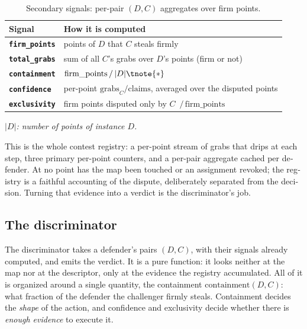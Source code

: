 \begin{otherlanguage}{english}
\begin{table}[ht]
  \centering
  \small
  \begin{threeparttable}
  \renewcommand{\arraystretch}{1.5}
  \begin{tabular}{@{}l p{11.6cm}@{}}
    \toprule
    \textbf{Signal} & \textbf{How it is computed} \\
    \midrule
    \textbf{\texttt{firm\_points}} & points of $D$ that $C$ steals firmly \\
    \textbf{\texttt{total\_grabs}} & sum of all $C$'s grabs over $D$'s points (firm or not) \\
    \textbf{\texttt{containment}}  & $\mathrm{firm\_points}\,/\,|D|\tnote{*}$ \\
    \textbf{\texttt{confidence}}   & per-point $\mathrm{grabs}_C/\mathrm{claims}$, averaged over the disputed points \\
    \textbf{\texttt{exclusivity}}  & firm points disputed only by $C$ $\,/\,\mathrm{firm\_points}$ \\
    \bottomrule
  \end{tabular}
  \begin{tablenotes}
    \footnotesize\item[*]\itshape $|D|$: number of points of instance $D$.
  \end{tablenotes}
  \end{threeparttable}
  \caption{Secondary signals: per-pair $(D,C)$ aggregates over firm points.}
  \label{tab:contest_secondary}
\end{table}

This is the whole contest registry: a per-point stream of grabs that drips at each step, three
primary per-point counters, and a per-pair aggregate cached per defender. At no point has the map
been touched or an assignment revoked; the registry is a faithful accounting of the dispute,
deliberately separated from the decision. Turning that evidence into a verdict is the discriminator's
job.

\subsection{The discriminator}
\label{sec:contest_discriminator}

The discriminator takes a defender's pairs $(D, C)$, with their signals already computed, and emits
the verdict. It is a pure function: it looks neither at the map nor at the descriptor, only at the
evidence the registry accumulated. All of it is organized around a single quantity, the containment
$\mathrm{containment}(D, C)$: what fraction of the defender the challenger firmly steals. Containment
decides the \emph{shape} of the action, and confidence and exclusivity decide whether there is
\emph{enough evidence} to execute it.


\end{otherlanguage}
